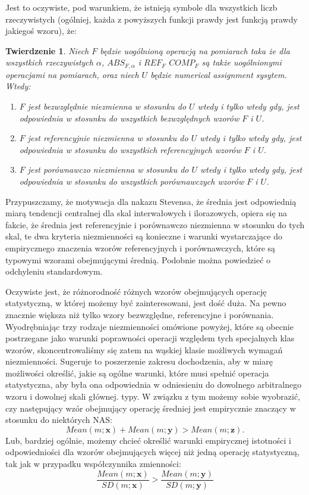 \documentclass[12pt,a4paper]{report}
\newtheorem{tw}[definition]{Twierdzenie}
\begin{document}
Jest to oczywiste, pod warunkiem, że istnieją symbole dla wszystkich liczb rzeczywistych (ogólniej, każda z powyższych funkcji prawdy jest funkcją prawdy jakiegoś wzoru), że:
\begin{tw}
Niech $F$ będzie uogólnioną operacją na pomiarach taka że dla wszystkich rzeczywistych $\alpha$, $ABS_{F,\alpha}$ i $REF_{F}$ $COMP_{F}$ są także uogólnionymi operacjami na pomiarach, oraz niech $U$ będzie numerical assignment sysytem. Wtedy:
\begin{enumerate}
\item
$F$ jest bezwzględnie niezmienna w stosunku do $U$ wtedy i tylko wtedy gdy, jest odpowiednia w stosunku do wszystkich bezwzględnych wzorów $F$ i $U$.
\item
$F$ jest referencyjnie niezmienna w stosunku do $U$ wtedy i tylko wtedy gdy, jest odpowiednia w stosunku do wszystkich referencyjnych wzorów $F$ i $U$.  
\item
$F$ jest porównawczo niezmienna w stosunku do $U$ wtedy i tylko wtedy gdy, jest odpowiednia w stosunku do wszystkich porównawczych wzorów $F$ i $U$.    
\end{enumerate}
\end{tw}

Przypuszczamy, że motywacja dla nakazu Stevensa, że średnia jest odpowiednią miarą tendencji centralnej dla skal interwałowych i ilorazowych, opiera się na fakcie, że średnia jest referencyjnie i porównawczo niezmienna w stosunku do tych skal, te dwa kryteria niezmienności są konieczne i warunki wystarczające do empirycznego znaczenia wzorów referencyjnych i porównawczych, które są typowymi wzorami obejmującymi średnią. Podobnie można powiedzieć o odchyleniu standardowym.

Oczywiste jest, że różnorodność różnych wzorów obejmujących operację statystyczną, w której możemy być zainteresowani, jest dość duża. Na pewno znacznie większa niż tylko wzory bezwzględne, referencyjne i porównania. Wyodrębniając trzy rodzaje niezmienności omówione powyżej, które są obecnie postrzegane jako warunki poprawności operacji względem tych specjalnych klas wzorów, skoncentrowaliśmy się zatem na wąskiej klasie możliwych wymagań niezmienności. Sugeruje to poszerzenie zakresu dochodzenia, aby w miarę możliwości określić, jakie są ogólne warunki, które musi spełnić operacja statystyczna, aby była ona odpowiednia w odniesieniu do dowolnego arbitralnego wzoru i dowolnej skali głównej. typy. W związku z tym możemy sobie wyobrazić, czy następujący wzór obejmujący operację średniej jest empirycznie znaczący w stosunku do niektórych NAS:
\begin{equation*}
Mean(m;\textbf{x})+Mean(m;\textbf{y})>Mean(m;\textbf{z}).
\end{equation*}
Lub, bardziej ogólnie, możemy chcieć określić warunki empirycznej istotności i odpowiedniości dla wzorów obejmujących więcej niż jedną operację statystyczną, tak jak w przypadku współczynnika zmienności:
\begin{equation*}
\frac{Mean(m;\textbf{x})}{SD(m;\textbf{x})} > \frac{Mean(m;\textbf{y})}{SD(m;\textbf{y})}
\end{equation*}
\end{document}
